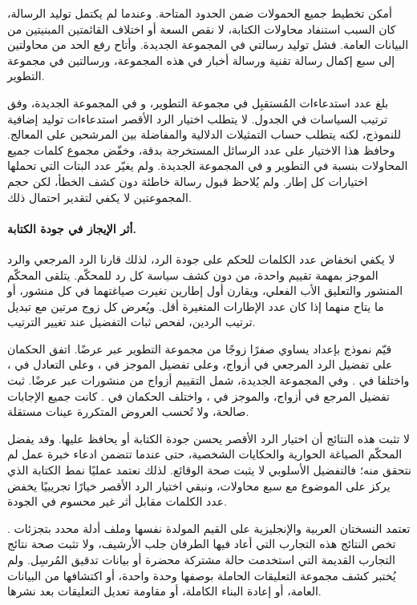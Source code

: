 أمكن تخطيط جميع الحمولات ضمن الحدود المتاحة. وعندما لم يكتمل توليد الرسالة، كان السبب استنفاد محاولات الكتابة، لا نقص السعة أو اختلاف القائمتين المبنيتين من البيانات العامة. فشل توليد رسالتي  في المجموعة الجديدة. وأتاح رفع الحد من محاولتين إلى سبع إكمال رسالة تقنية ورسالة أخبار في هذه المجموعة، ورسالتين في مجموعة التطوير.

بلغ عدد استدعاءات المُستقبِل \NUM{\FreshDevTwoReceiverCalls/\FreshDevSevenReceiverCalls/\FreshDevConciseReceiverCalls} في مجموعة التطوير، و\NUM{\FreshHeldTwoReceiverCalls/\FreshHeldSevenReceiverCalls/\FreshHeldConciseReceiverCalls} في المجموعة الجديدة، وفق ترتيب السياسات في الجدول. لا يتطلب اختيار الرد الأقصر استدعاءات توليد إضافية للنموذج، لكنه يتطلب حساب التمثيلات الدلالية والمفاضلة بين المرشحين على المعالج. وحافظ هذا الاختيار على عدد الرسائل المستخرجة بدقة، وخفّض مجموع كلمات جميع المحاولات بنسبة \NUM{\FreshDevSaving\%} في التطوير و\NUM{\FreshHeldSaving\%} في المجموعة الجديدة. ولم يغيّر عدد البتات التي تحملها اختيارات كل إطار. ولم يُلاحظ قبول رسالة خاطئة دون كشف الخطأ، لكن حجم المجموعتين لا يكفي لتقدير احتمال ذلك.

\paragraph{أثر الإيجاز في جودة الكتابة.}
لا يكفي انخفاض عدد الكلمات للحكم على جودة الرد، لذلك قارنا الرد المرجعي والرد الموجز بمهمة تقييم واحدة، من دون كشف سياسة كل رد للمحكّم. يتلقى المحكّم المنشور والتعليق الأب الفعلي، ويقارن أول إطارين تغيرت صياغتهما في كل منشور، أو ما يتاح منهما إذا كان عدد الإطارات المتغيرة أقل. ويُعرض كل زوج مرتين مع تبديل ترتيب الردين، لفحص ثبات التفضيل عند تغيير الترتيب.

قيّم نموذج  بإعداد  يساوي صفرًا \NUM{\FreshDevPairs} زوجًا من مجموعة التطوير عبر \NUM{\FreshDevOrders} عرضًا. اتفق الحكمان على تفضيل الرد المرجعي في \NUM{\FreshDevBaselineWins} أزواج، وعلى تفضيل الموجز في \NUM{\FreshDevConciseWins}، وعلى التعادل في \NUM{\FreshDevTies}، واختلفا في \NUM{\FreshDevDiscordant}. وفي المجموعة الجديدة، شمل التقييم \NUM{\FreshHeldPairs} أزواج من \NUM{\FreshHeldQualityPosts} منشورات عبر \NUM{\FreshHeldOrders} عرضًا. ثبت تفضيل المرجع في \NUM{\FreshHeldBaselineWins} أزواج، والموجز في \NUM{\FreshHeldConciseWins}، واختلف الحكمان في \NUM{\FreshHeldDiscordant}. كانت جميع الإجابات صالحة، ولا تُحسب العروض المتكررة عينات مستقلة.

لا تثبت هذه النتائج أن اختيار الرد الأقصر يحسن جودة الكتابة أو يحافظ عليها. وقد يفضل المحكّم الصياغة الحوارية والحكايات الشخصية، حتى عندما تتضمن ادعاء خبرة عمل لم نتحقق منه؛ فالتفضيل الأسلوبي لا يثبت صحة الوقائع. لذلك نعتمد عمليًا نمط الكتابة الذي يركز على الموضوع مع سبع محاولات، ونبقي اختيار الرد الأقصر خيارًا تجريبيًا يخفض عدد الكلمات مقابل أثر غير محسوم في الجودة.

تعتمد النسختان العربية والإنجليزية على القيم المولدة نفسها وملف أدلة محدد بتجزئات . تخص النتائج هذه التجارب التي أعاد فيها الطرفان جلب الأرشيف، ولا تثبت صحة نتائج التجارب القديمة التي استخدمت حالة مشتركة محضرة أو بيانات تدقيق المُرسِل. ولم يُختبر كشف مجموعة التعليقات الحاملة بوصفها وحدة واحدة، أو اكتشافها من البيانات العامة، أو إعادة البناء الكاملة، أو مقاومة تعديل التعليقات بعد نشرها.
